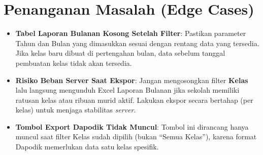 \section{Penanganan Masalah (Edge Cases)}
\begin{itemize}
    \item \textbf{Tabel Laporan Bulanan Kosong Setelah Filter}: Pastikan parameter Tahun dan Bulan yang dimasukkan sesuai dengan rentang data yang tersedia. Jika kelas baru dibuat di pertengahan bulan, data sebelum tanggal pembuatan kelas tidak akan tersedia.
    \item \textbf{Risiko Beban Server Saat Ekspor}: Jangan mengosongkan filter \textbf{Kelas} lalu langsung mengunduh Excel Laporan Bulanan jika sekolah memiliki ratusan kelas atau ribuan murid aktif. Lakukan ekspor secara bertahap (per kelas) untuk menjaga stabilitas \textit{server}.
    \item \textbf{Tombol Export Dapodik Tidak Muncul}: Tombol ini dirancang hanya muncul saat filter Kelas sudah dipilih (bukan ``Semua Kelas''), karena format Dapodik memerlukan data satu kelas spesifik.
\end{itemize}
